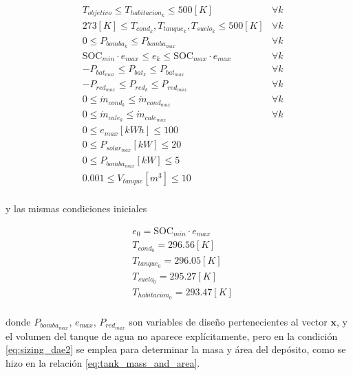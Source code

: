 \begin{align}
	 & T_{objetivo} \leq T_{habitacion_k} \leq 500[K]                                    & \forall k \\
	 & 273[K] \leq T_{cond_k}, T_{tanque_k}, T_{suelo_k} \leq 500[K]                     & \forall k \\
	 & 0 \leq P_{bomba_k} \leq P_{bomba_{max}} \quad                                     & \forall k \\
	 & \text{SOC}_{min} \cdot e_{max} \leq e_k \leq \text{SOC}_{max} \cdot e_{max} \quad & \forall k \\
	 & -P_{bat_{max}} \leq P_{bat_k} \leq P_{bat_{max}} \quad                            & \forall k \\
	 & -P_{red_{max}} \leq P_{red_k} \leq P_{red_{max}} \quad                            & \forall k \\
	 & 0 \leq \dot{m}_{cond_k} \leq \dot{m}_{cond_{max}} \quad                           & \forall k \\
	 & 0 \leq \dot{m}_{cale_k} \leq \dot{m}_{cale_{max}} \quad                           & \forall k \\
	 & 0 \leq e_{max} [kWh] \leq 100                                                                 \\
	 & 0 \leq P_{solar_{max}} [kW] \leq 20                                                           \\
	 & 0 \leq P_{bomba_{max}} [kW] \leq 5                                                            \\
	 & 0.001 \leq V_{tanque} [m^3] \leq 10                                                           \\
\end{align}

y las mismas condiciones iniciales

\begin{align}
	 & e_0 = \text{SOC}_{min} \cdot e_{max} \\
	 & T_{cond_0} = 296.56 [K]              \\
	 & T_{tanque_0} = 296.05[K]             \\
	 & T_{suelo_0} = 295.27[K]              \\
	 & T_{habitacion_0} = 293.47[K]         \\
\end{align}


donde $P_{bomba_{max}}$, $e_{max}$, $P_{red_{max}}$ son variables de diseño
pertenecientes al vector $\mathbf{x}$, y el volumen del tanque de agua no
aparece explícitamente, pero en la condición \eqref{eq:sizing_dae2} se emplea
para determinar la masa y área del depósito, como se hizo en la relación
\eqref{eq:tank_mass_and_area}.

